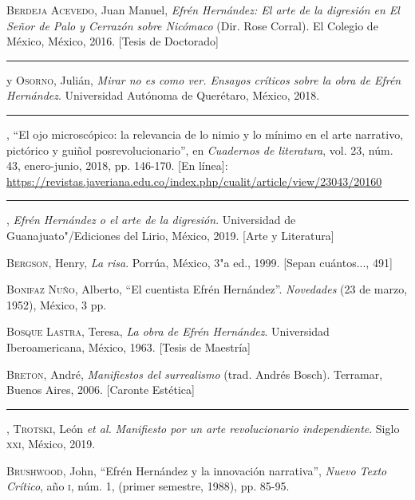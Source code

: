 \documentclass[14pt,twoside,final]{extbook} %
\begin{document}
\textsc{Berdeja Acevedo}, Juan Manuel, \emph{Efrén Hernández: El arte de la digresión en \emph{El Señor de Palo} y \emph{Cerrazón sobre Nicómaco}} (Dir. Rose Corral). El Colegio de México, México, 2016. [Tesis de Doctorado]\label{bib:berdeja2016}

\rule{1cm}{0.4pt} y \textsc{Osorno}, Julián, \emph{Mirar no es como ver. Ensayos críticos sobre la obra de Efrén Hernández}. Universidad Autónoma de Querétaro, México, 2018.\label{bib:berdeja2018a}

\rule{1cm}{0.4pt}, ``El ojo microscópico: la relevancia de lo nimio y lo mínimo en el arte narrativo, pictórico y guiñol posrevolucionario'', en \emph{Cuadernos de literatura}, vol. 23, núm. 43, enero-junio, 2018, pp. 146-170. [En línea]: \url{https://revistas.javeriana.edu.co/index.php/cualit/article/view/23043/20160}\label{bib:berdeja2018b}

\rule{1cm}{0.4pt}, \emph{Efrén Hernández o el arte de la digresión}. Universidad de Guanajuato"/Ediciones del Lirio, México, 2019. [Arte y Literatura]\label{bib:berdeja2019} 

\textsc{Bergson}, Henry, \emph{La risa}. Porrúa, México, 3"a ed., 1999. [Sepan cuántos..., 491]\label{bib:bergson1999}

\textsc{Bonifaz Nuño}, Alberto, ``El cuentista Efrén Hernández''. \emph{Novedades} (23 de marzo, 1952), México, 3 pp.\label{bib:bonifaz1952}

\textsc{Bosque Lastra}, Teresa, \emph{La obra de Efrén Hernández}. Universidad Iberoamericana, México, 1963. [Tesis de Maestría]\label{bib:bosque1963}

\textsc{Breton}, André, \emph{Manifiestos del surrealismo} (trad. Andrés Bosch). Terramar, Buenos Aires, 2006. [Caronte Estética]\label{bib:breton2006}

\rule{1cm}{0.4pt}, \textsc{Trotski}, León \emph{et al.} \emph{Manifiesto por un arte revolucionario independiente}. Siglo \textsc{xxi}, México, 2019.\label{bib:breton2019}

\textsc{Brushwood}, John, ``Efrén Hernández y la innovación narrativa'', \emph{Nuevo Texto Crítico}, año \textsc{i}, núm. 1, (primer semestre, 1988), pp. 85-95.\label{bib:}
\end{document}
